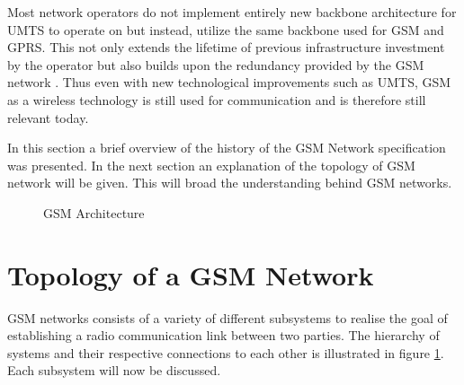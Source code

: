 Most network operators do not implement entirely new backbone architecture for UMTS\label{UMTSGSMBackbone} to operate on but instead, utilize the same backbone used for GSM and GPRS. This not only extends the lifetime of previous infrastructure investment by the operator but also builds upon the redundancy provided by the GSM network \cite{GSMArchitectureProtocolsServices}. Thus even with new technological improvements such as UMTS, GSM as a wireless technology is still used for communication and is therefore still relevant today.

In this section a brief overview of the history of the GSM Network specification was presented. In the next section an explanation of the topology of GSM network will be given. This will broad the understanding behind GSM networks.

\begin{figure}[hptb]
	\begin{centering}
		
		\caption{GSM Architecture}
		\label{fig:GSMArchitecture}
	\end{centering}
\end{figure}

\section{Topology of a GSM Network}
\label{sec:GSMArch}
GSM networks consists of a variety of different subsystems to realise the goal of establishing a radio communication link between two parties. The hierarchy of systems and their respective connections to each other is illustrated in figure \ref{fig:GSMArchitecture}. Each subsystem will now be discussed.
